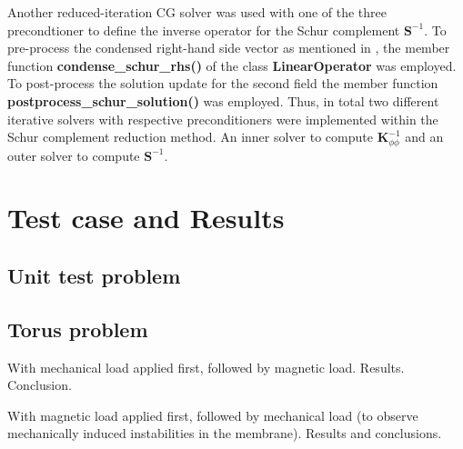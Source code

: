 \documentclass[11pt,a4paper,final]{article}
\begin{document}
Another reduced-iteration CG solver was used with one of the three precondtioner to define the inverse operator for the Schur complement $\mathbf{S}^{-1}$. To pre-process the condensed right-hand side vector as mentioned in , the member function \textbf{condense\_schur_rhs()} of the class \textbf{LinearOperator} was employed. To post-process the solution update for the second field the member function \textbf{postprocess\_schur_solution()} was employed. Thus, in total two different iterative solvers with respective preconditioners were implemented within the Schur complement reduction method. An inner solver to compute $\mathbf{K}_{\phi \phi}^{-1}$ and an outer solver to compute $\mathbf{S}^{-1}$.

\section{Test case and Results}
\subsection{Unit test problem}

\subsection{Torus problem}
With mechanical load applied first, followed by magnetic load. Results. Conclusion. \par 

With magnetic load applied first, followed by mechanical load (to observe mechanically induced instabilities in the membrane). Results and conclusions.


\newpage
\printbibliography
\end{document}
